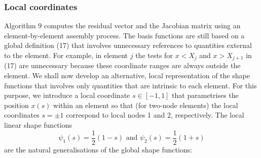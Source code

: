 \hypertarget{index_local_coords}{}\subsubsection{Local coordinates}\label{index_local_coords}
Algorithm 9 computes the residual vector and the Jacobian matrix using an element-\/by-\/element assembly process. The basis functions are still based on a global definition (17) that involves unnecessary references to quantities external to the element. For example, in element $ j $ the tests for $ x < X_j$ and $ x > X_{j+1}$ in (17) are unnecessary because these coordinate ranges are always outside the element. We shall now develop an alternative, local representation of the shape functions that involves only quantities that are intrinsic to each element. For this purpose, we introduce a local coordinate $s \in [-1,1] $ that parametrises the position $ x(s) $ within an element so that (for two-\/node elements) the local coordinates $s=\pm 1$ correspond to local nodes 1 and 2, respectively. The local linear shape functions \[ \psi_1(s) = \frac{1}{2}(1-s) \mbox{\ \ \ and \ \ \ } \psi_2(s) = \frac{1}{2}(1+s)\] are the natural generalisations of the global shape functions\-:
